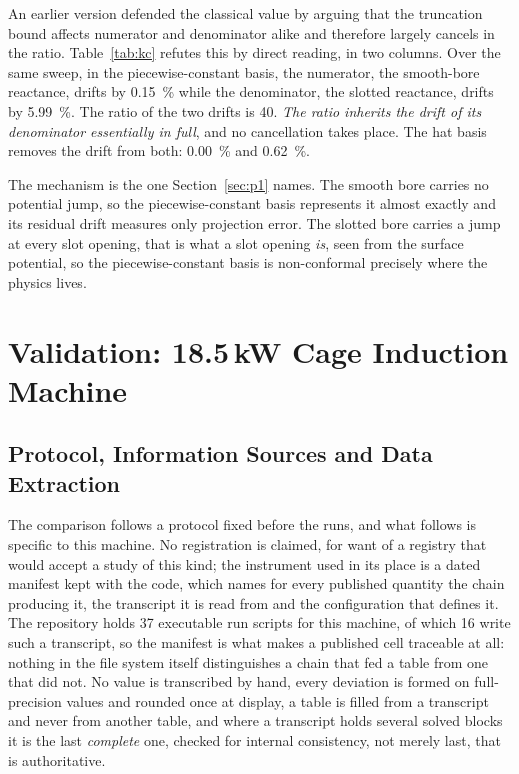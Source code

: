 \documentclass[10pt,a4paper,twocolumn]{article}
\theoremstyle{plain}
\theoremstyle{remark}
\begin{document}
An earlier version defended the classical value by arguing that the
truncation bound affects numerator and denominator alike and therefore
largely cancels in the ratio. Table~\ref{tab:kc} refutes this by direct
reading, in two columns. Over the same sweep, in the piecewise-constant
basis, the numerator, the smooth-bore reactance, drifts by
\SI{0.15}{\percent} while the denominator, the slotted
reactance, drifts by \SI{5.99}{\percent}. The ratio of the two drifts
is \num{40}. \emph{The ratio inherits the drift of its denominator
essentially in full}, and no cancellation takes place. The hat basis
removes the drift from both: \SI{0.00}{\percent} and
\SI{0.62}{\percent}.

The mechanism is the one Section~\ref{sec:p1} names. The smooth bore
carries no potential jump, so the piecewise-constant basis represents it
almost exactly and its residual drift measures only projection error.
The slotted bore carries a jump at every slot opening, that is what a
slot opening \emph{is}, seen from the surface potential, so the
piecewise-constant basis is non-conformal precisely where the physics
lives.

\section{Validation: 18.5\,kW Cage Induction Machine}
\label{sec:im}

\subsection{Protocol, Information Sources and Data Extraction}
\label{sub:im_protocol}

The comparison follows a protocol fixed before the runs, and what
follows is specific to this machine. No registration
is claimed, for want of a registry that would accept a study of this
kind; the instrument used in its place is a dated manifest kept with the
code, which names for every published quantity the chain producing it,
the transcript it is read from and the configuration that defines it. The repository
holds \num{37} executable run scripts for this machine, of which
\num{16} write such a transcript, so the manifest is what makes a
published cell traceable at all: nothing in the file system itself
distinguishes a chain that fed a table from one that did not. No value is transcribed by hand, every deviation
is formed on full-precision values and rounded once at display, a table
is filled from a transcript and never from another table, and where a
transcript holds several solved blocks it is the last \emph{complete}
one, checked for internal consistency, not merely last, that is
authoritative.
\end{document}
